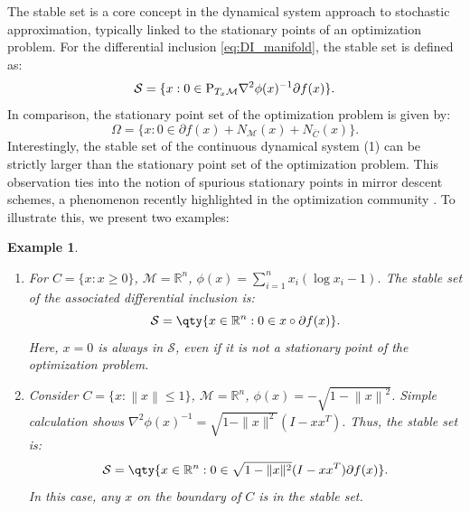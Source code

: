 \documentclass[11pt]{article}
\newcommand{\R}{\mathbb R}
\newcommand{\cM}{\mathcal M}
\newcommand{\cS}{\mathcal S}
\def\norm#1{\left\|#1\right\|}
\newtheorem{example}{Example}[section]
\begin{document}
The stable set is a core concept in the dynamical system approach to stochastic approximation, typically linked to the stationary points of an optimization problem. For the differential inclusion \eqref{eq:DI_manifold}, the stable set is defined as:
\begin{equation}
\cS=\{x:0\in{\rm P}_{T_x\cM}\nabla^2\phi(x)^{-1}\partial f(x)\}.
\label{def:stable_set}
\end{equation}
In comparison, the stationary point set of the optimization problem is given by:
\begin{equation}
\Omega=\{x:0\in\partial f(x)+N_{\cM}(x)+N_{\overline C}(x)\}.
\label{def:stationary_set}
\end{equation}
Interestingly, the stable set of the continuous dynamical system (1) can be strictly larger than the stationary point set of the optimization problem. This observation ties into the notion of spurious stationary points in mirror descent schemes, a phenomenon recently highlighted in the optimization community \cite{chen2024spurious,zhang2024stochastic}. To illustrate this, we present two examples:
\begin{example}
\label{example:stable_set}
\begin{enumerate}
    \item For $C=\{x:x\geq0\}$, $\cM=\R^n$, $\phi(x)=\sum_{i=1}^nx_i(\log x_i-1)$. The stable set of the associated differential inclusion is:
    \[
    \cS=\qty{x\in\R^n: 0\in x\circ\partial f(x)}.
    \]
    Here, $ x = 0 $ is always in $ \mathcal{S} $, even if it is not a stationary point of the optimization problem.
    \item Consider $C=\{x:\norm{x}\leq1\}$, $\cM=\R^n$, $\phi(x)=-\sqrt{1-\norm{x}^2}$. Simple calculation shows $\nabla^2 \phi(x)^{-1} = \sqrt{1 - \|x\|^2} (I - x x^T).$
    Thus, the stable set is:
    \[
    \cS=\qty{x\in\R^n: 0\in \sqrt{1 - \|x\|^2} (I - x x^T)\partial f(x)}.
    \]
    In this case, any $ x $ on the boundary of $ C $ is in the stable set.
\end{enumerate}
\end{example}
\end{document}
